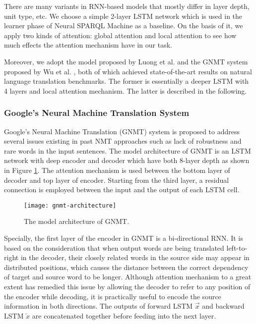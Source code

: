 There are many variants in RNN-based models that mostly differ in layer depth, unit type, etc. We choose a simple 2-layer LSTM network which is used in the learner phase of Neural SPARQL Machine \cite{Soru2018a} as a baseline. On the basis of it, we apply two kinds of attention: global attention \cite{Bahdanau2014} and local attention \cite{Luong2015} to see how much effects the attention mechanism have in our task.

Moreover, we adopt the model proposed by Luong et al. \cite{Luong2015} and the GNMT system proposed by Wu et al. \cite{Wu2016}, both of which achieved state-of-the-art results on natural language translation benchmarks. The former is essentially a deeper LSTM with 4 layers and local attention mechanism. The latter is described in the following.

\subsubsection*{Google's Neural Machine Translation System}

Google's Neural Machine Translation (GNMT) system \cite{Wu2016} is proposed to address several issues existing in past NMT approaches such as lack of robustness and rare words in the input sentences. The model architecture of GNMT is an LSTM network with deep encoder and decoder which have both 8-layer depth as shown in Figure \ref{figure:gnmt architecture}. The attention mechanism is used between the bottom layer of decoder and top layer of encoder. Starting from the third layer, a residual connection is employed between the input and the output of each LSTM cell.

\begin{figure}[h]
\texttt{[image: gnmt-architecture]}
\centering
\caption{The model architecture of GNMT.}
\label{figure:gnmt architecture}
\end{figure}

Specially, the first layer of the encoder in GNMT is a bi-directional RNN. It is based on the consideration that when output words are being translated left-to-right in the decoder, their closely related words in the source side may appear in distributed positions, which causes the distance between the correct dependency of target and source word to be longer. Although attention mechanism to a great extent has remedied this issue by allowing the decoder to refer to any position of the encoder while decoding, it is practically useful to encode the source information in both directions. The outputs of forward LSTM $ \overrightarrow{x} $ and backward LSTM $ \overleftarrow{x} $ are concatenated together before feeding into the next layer.


